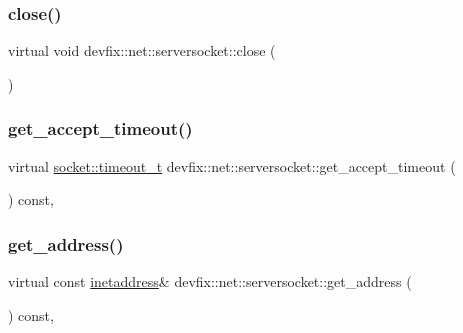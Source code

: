 \subsubsection{\texorpdfstring{close()}{close()}}
{\footnotesize\ttfamily virtual void devfix\+::net\+::serversocket\+::close (\begin{DoxyParamCaption}{ }\end{DoxyParamCaption})\hspace{0.3cm}{\ttfamily [pure virtual]}}

\mbox{\label{structdevfix_1_1net_1_1serversocket_acde0979277bf9536f54bb0fb6a9cc881}} 
\subsubsection{\texorpdfstring{get\+\_\+accept\+\_\+timeout()}{get\_accept\_timeout()}}
{\footnotesize\ttfamily virtual \hyperlink{structdevfix_1_1net_1_1socket_a80a3bf4cb7292bae31ea9c6575539c68}{socket\+::timeout\+\_\+t} devfix\+::net\+::serversocket\+::get\+\_\+accept\+\_\+timeout (\begin{DoxyParamCaption}{ }\end{DoxyParamCaption}) const\hspace{0.3cm}{\ttfamily [pure virtual]}, {\ttfamily [noexcept]}}

\mbox{\label{structdevfix_1_1net_1_1serversocket_a087a819b8173bfa101ea65ea8a17eb8c}} 
\subsubsection{\texorpdfstring{get\+\_\+address()}{get\_address()}}
{\footnotesize\ttfamily virtual const \hyperlink{structdevfix_1_1net_1_1inetaddress}{inetaddress}\& devfix\+::net\+::serversocket\+::get\+\_\+address (\begin{DoxyParamCaption}{ }\end{DoxyParamCaption}) const\hspace{0.3cm}{\ttfamily [pure virtual]}, {\ttfamily [noexcept]}}

